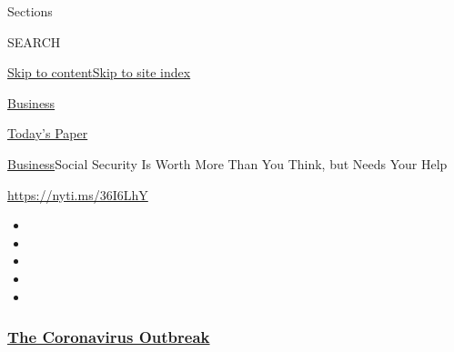 Sections

SEARCH

\protect\hyperlink{site-content}{Skip to
content}\protect\hyperlink{site-index}{Skip to site index}

\href{https://www.nytimes3xbfgragh.onion/section/business}{Business}

\href{https://myaccount.nytimes3xbfgragh.onion/auth/login?response_type=cookie\&client_id=vi}{}

\href{https://www.nytimes3xbfgragh.onion/section/todayspaper}{Today's
Paper}

\href{/section/business}{Business}\textbar{}Social Security Is Worth
More Than You Think, but Needs Your Help

\url{https://nyti.ms/36I6LhY}

\begin{itemize}
\item
\item
\item
\item
\item
\end{itemize}

\hypertarget{the-coronavirus-outbreak}{%
\subsubsection{\texorpdfstring{\href{https://www.nytimes3xbfgragh.onion/news-event/coronavirus?name=styln-coronavirus-markets\&region=TOP_BANNER\&block=storyline_menu_recirc\&action=click\&pgtype=Article\&impression_id=03474fc0-f52d-11ea-85d5-a5147cba864a\&variant=undefined}{The
Coronavirus
Outbreak}}{The Coronavirus Outbreak}}\label{the-coronavirus-outbreak}}

